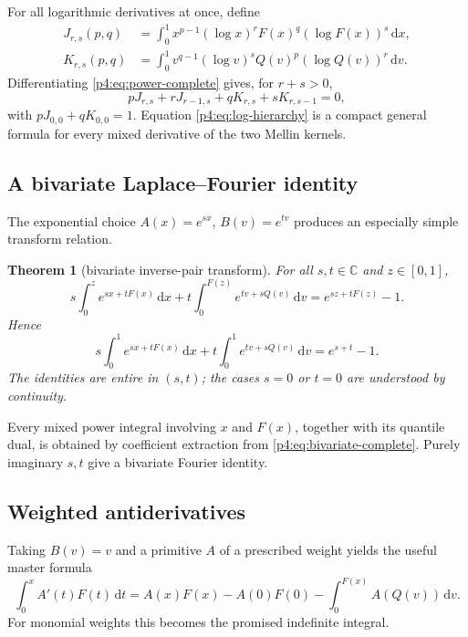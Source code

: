 \documentclass[11pt,oneside]{article}
\newtheorem{theorem}{Theorem}[section]
\theoremstyle{definition}
\theoremstyle{remark}
\newcommand{\F}{F}
\newcommand{\Q}{Q}
\newcommand{\C}{\mathbb C}
\newcommand{\dd}{\,\mathrm d}
\newcommand{\1}{\mathbf 1}
\begin{document}
For all logarithmic derivatives at once, define
\begin{align}
 J_{r,s}(p,q)&=\int_0^1x^{p-1}(\log x)^r\F(x)^q(\log\F(x))^s\dd x,\label{p4:eq:Jrs}\\
 K_{r,s}(p,q)&=\int_0^1v^{q-1}(\log v)^s\Q(v)^p(\log\Q(v))^r\dd v.\label{p4:eq:Krs}
\end{align}
Differentiating \cref{p4:eq:power-complete} gives, for \(r+s>0\),
\begin{equation}\label{p4:eq:log-hierarchy}
 pJ_{r,s}+rJ_{r-1,s}+qK_{r,s}+sK_{r,s-1}=0,
\end{equation}
with \(pJ_{0,0}+qK_{0,0}=1\).  Equation \cref{p4:eq:log-hierarchy} is a compact
general formula for every mixed derivative of the two Mellin kernels.

\subsection{A bivariate Laplace--Fourier identity}

The exponential choice \(A(x)=e^{sx}\), \(B(v)=e^{tv}\) produces an especially
simple transform relation.

\begin{theorem}[bivariate inverse-pair transform]\label{p4:thm:bivariate-exp}
For all \(s,t\in\C\) and \(z\in[0,1]\),
\begin{equation}\label{p4:eq:bivariate-incomplete}
 s\int_0^z e^{sx+t\F(x)}\dd x
 +t\int_0^{\F(z)}e^{tv+s\Q(v)}\dd v
 =e^{sz+t\F(z)}-1.
\end{equation}
Hence
\begin{equation}\label{p4:eq:bivariate-complete}
 s\int_0^1e^{sx+t\F(x)}\dd x
 +t\int_0^1e^{tv+s\Q(v)}\dd v
 =e^{s+t}-1.
\end{equation}
The identities are entire in \((s,t)\); the cases \(s=0\) or \(t=0\) are understood
by continuity.
\end{theorem}

Every mixed power integral involving \(x\) and \(\F(x)\), together with its quantile
dual, is obtained by coefficient extraction from \cref{p4:eq:bivariate-complete}.  Purely
imaginary \(s,t\) give a bivariate Fourier identity.

\subsection{Weighted antiderivatives}

Taking \(B(v)=v\) and a primitive \(A\) of a prescribed weight yields the useful
master formula
\begin{equation}\label{p4:eq:weighted-antiderivative-master}
 \int_0^x A'(t)\F(t)\dd t
 =A(x)\F(x)-A(0)\F(0)-\int_0^{\F(x)}A(\Q(v))\dd v.
\end{equation}
For monomial weights this becomes the promised indefinite integral.
\end{document}
